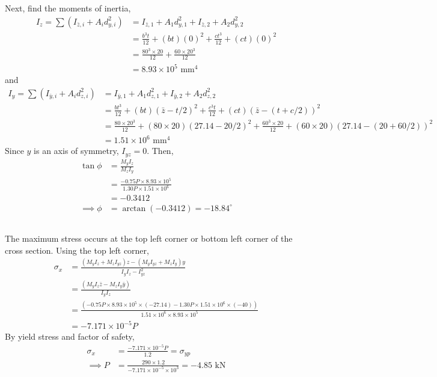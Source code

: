 Next, find the moments of inertia,
\begin{align*}
    I_z = \sum(I_{\bar{z}, i} + A_i d_{y, i}^2) &= I_{\bar{z}, 1} + A_1 d_{y, 1}^2 + I_{\bar{z}, 2} + A_2 d_{y, 2}^2 \\
    &= \frac{b^3t}{12} + (bt)(0)^2 + \frac{ct^3}{12} + (ct)(0)^2 \\
    &= \frac{80^3\times20}{12} + \frac{60\times20^3}{12} \\
    &= 8.93 \times 10^{5} \text{ mm}^4
\end{align*}
and
\begin{align*}
    I_y = \sum(I_{\bar{y}, i} + A_i d_{z, i}^2) &= I_{\bar{y}, 1} + A_1 d_{z, 1}^2 + I_{\bar{y}, 2} + A_2 d_{z, 2}^2 \\
    &= \frac{bt^3}{12} + (bt)(\bar{z} - t/2)^2 + \frac{c^3t}{12} + (ct)(\bar{z} - (t + c/2))^2 \\
    &= \frac{80\times20^3}{12} + (80\times20)(27.14 - 20/2)^2 + \frac{60^3\times20}{12} + (60\times20)(27.14 - (20 + 60/2))^2 \\
    &= 1.51 \times 10^{6} \text{ mm}^4
\end{align*}
Since $y$ is an axis of symmetry, $I_{yz} = 0$. Then,
\begin{align*}
    \tan{\phi} &= \frac{M_y I_z}{M_z I_y} \\
    &= \frac{-0.75P \times 8.93 \times 10^{5}}{1.30P \times 1.51 \times 10^{6}} \\
    &= -0.3412 \\ 
    \implies \phi &= \arctan(-0.3412) = \boxed{-18.84^{\circ}}
\end{align*}

\subsection{}
The maximum stress occurs at the top left corner or bottom left corner of the cross section. Using the top left corner,
\begin{align*}
    \sigma_{x} &= \frac{(M_y I_z + M_z I_{yz})z - (M_y I_{yz} + M_z I_y)y}{I_y I_z - I_{yz}^2} \\
    &= \frac{(M_y I_z \bar{z} - M_z I_y \bar{y})}{I_y I_z} \\
    &= \frac{(-0.75P \times 8.93 \times 10^{5} \times (-27.14) - 1.30P \times 1.51 \times 10^{6} \times (-40))}{1.51 \times 10^{6} \times 8.93 \times 10^{5}} \\
    &= -7.171\times 10^{-5}P
\end{align*}
By yield stress and factor of safety,
\begin{align*}
    \sigma_{x} &= \frac{-7.171 \times 10^{-5} P}{1.2} = \sigma_{yp} \\
    \implies P &= \frac{290 \times 1.2}{-7.171 \times 10^{-5}\times 10^{3}} = \boxed{-4.85 \text{ kN}}
\end{align*}
